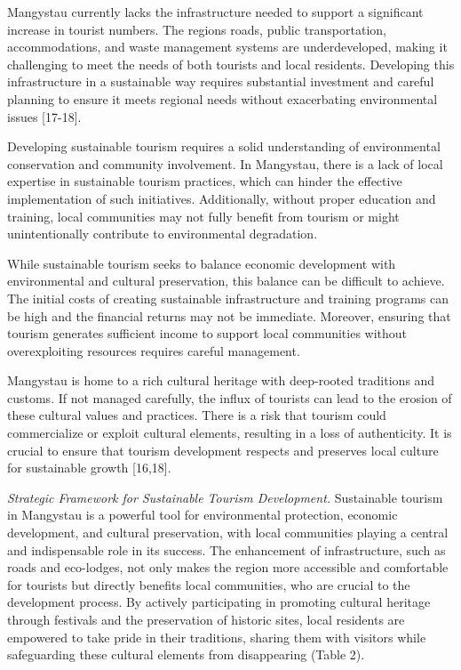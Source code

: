 Mangystau currently lacks the infrastructure needed to support a
significant increase in tourist numbers. The region\textquotesingle s
roads, public transportation, accommodations, and waste management
systems are underdeveloped, making it challenging to meet the needs of
both tourists and local residents. Developing this infrastructure in a
sustainable way requires substantial investment and careful planning to
ensure it meets regional needs without exacerbating environmental issues
{[}17-18{]}.

Developing sustainable tourism requires a solid understanding of
environmental conservation and community involvement. In Mangystau,
there is a lack of local expertise in sustainable tourism practices,
which can hinder the effective implementation of such initiatives.
Additionally, without proper education and training, local communities
may not fully benefit from tourism or might unintentionally contribute
to environmental degradation.

While sustainable tourism seeks to balance economic development with
environmental and cultural preservation, this balance can be difficult
to achieve. The initial costs of creating sustainable infrastructure and
training programs can be high and the financial returns may not be
immediate. Moreover, ensuring that tourism generates sufficient income
to support local communities without overexploiting resources requires
careful management.

Mangystau is home to a rich cultural heritage with deep-rooted
traditions and customs. If not managed carefully, the influx of tourists
can lead to the erosion of these cultural values and practices. There is
a risk that tourism could commercialize or exploit cultural elements,
resulting in a loss of authenticity. It is crucial to ensure that
tourism development respects and preserves local culture for sustainable
growth {[}16,18{]}.

\emph{Strategic Framework for Sustainable Tourism Development.}
Sustainable tourism in Mangystau is a powerful tool for environmental
protection, economic development, and cultural preservation, with local
communities playing a central and indispensable role in its success. The
enhancement of infrastructure, such as roads and eco-lodges, not only
makes the region more accessible and comfortable for tourists but
directly benefits local communities, who are crucial to the development
process. By actively participating in promoting cultural heritage
through festivals and the preservation of historic sites, local
residents are empowered to take pride in their traditions, sharing them
with visitors while safeguarding these cultural elements from
disappearing (Table 2).

